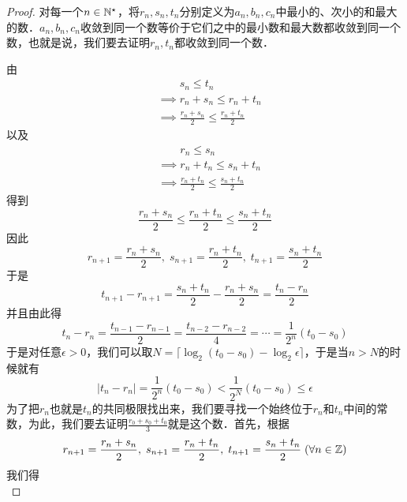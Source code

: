 \begin{proof}
    对每一个$n \in \mathbb{N}^\star$，将$r_n,s_n,t_n$分别定义为$a_n,b_n,c_n$中最小的、次小的和最大的数．$a_n,b_n,c_n$收敛到同一个数等价于它们之中的最小数和最大数都收敛到同一个数，也就是说，我们要去证明$r_n,t_n$都收敛到同一个数．

\noindent 由
\begin{align}
    &\mathrel{\phantom{\implies}} s_n \leq t_n \\
    &\implies r_n + s_n \leq r_n + t_n \\
    &\implies \frac{r_n+s_n}{2} \leq \frac{r_n+t_n}{2} 
\end{align}
以及
\begin{align}
    &\mathrel{\phantom{\implies}} r_n \leq s_n \\
    &\implies r_n + t_n \leq s_n + t_n \\
    &\implies \frac{r_n+t_n}{2} \leq \frac{s_n+t_n}{2}
\end{align}
得到
\begin{equation}
    \frac{r_n+s_n}{2} \leq \frac{r_n+t_n}{2} \leq \frac{s_n+t_n}{2}
\end{equation}
因此
\begin{equation}
    r_{n+1} = \frac{r_n+s_n}{2}, \; s_{n+1} = \frac{r_n+t_n}{2}, \; t_{n+1}=\frac{s_n+t_n}{2}
\end{equation}
于是
\begin{equation}
    t_{n+1} - r_{n+1} = \frac{s_n+t_n}{2} - \frac{r_n+s_n}{2} = \frac{t_n - r_n}{2}
\end{equation}
\noindent 并且由此得
\begin{equation}
t_n - r_n = \frac{t_{n-1}-r_{n-1}}{2} = \frac{t_{n-2}-r_{n-2}}{4} = \cdots = \frac{1}{2^{n}}\left(t_0 - s_0\right)
\end{equation}
于是对任意$\epsilon > 0$，我们可以取$N = \lceil \log_2 \left(t_0-s_0\right) - \log_2 \epsilon \rceil$，于是当$n > N$的时候就有
\begin{equation}
    |t_n-r_n|=\frac{1}{2^n}(t_0-s_0) < \frac{1}{2^N}(t_0-s_0) \leq \epsilon
\end{equation}
为了把$r_n$也就是$t_n$的共同极限找出来，我们要寻找一个始终位于$r_n$和$t_n$中间的常数，为此，我们要去证明$\displaystyle\frac{r_0+s_0+t_0}{3}$就是这个数．首先，根据
\begin{equation}
    r_{n+1} = \frac{r_n+s_n}{2}, \; s_{n+1} = \frac{r_n+t_n}{2}, \; t_{n+1}=\frac{s_n+t_n}{2} \; (\forall n \in \mathbb{Z})
\end{equation}
我们得
\begin{equation}

\end{equation}
\end{proof}
